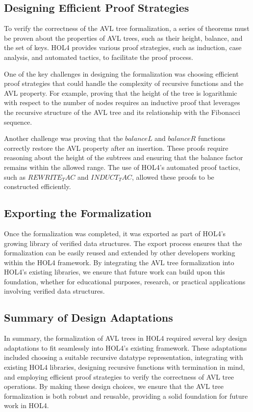 \documentclass[12pt]{article}
\begin{document}
\subsection{Designing Efficient Proof Strategies}

To verify the correctness of the AVL tree formalization, a series of theorems must be proven about the properties of AVL trees, such as their height, balance, and the set of keys. HOL4 provides various proof strategies, such as induction, case analysis, and automated tactics, to facilitate the proof process.

One of the key challenges in designing the formalization was choosing efficient proof strategies that could handle the complexity of recursive functions and the AVL property. For example, proving that the height of the tree is logarithmic with respect to the number of nodes requires an inductive proof that leverages the recursive structure of the AVL tree and its relationship with the Fibonacci sequence.

Another challenge was proving that the \(balanceL\) and \(balanceR\) functions correctly restore the AVL property after an insertion. These proofs require reasoning about the height of the subtrees and ensuring that the balance factor remains within the allowed range. The use of HOL4’s automated proof tactics, such as \(REWRITE_TAC\) and \(INDUCT_TAC\), allowed these proofs to be constructed efficiently.

\subsection{Exporting the Formalization}

Once the formalization was completed, it was exported as part of HOL4’s growing library of verified data structures. The export process ensures that the formalization can be easily reused and extended by other developers working within the HOL4 framework. By integrating the AVL tree formalization into HOL4’s existing libraries, we ensure that future work can build upon this foundation, whether for educational purposes, research, or practical applications involving verified data structures.

\subsection{Summary of Design Adaptations}

In summary, the formalization of AVL trees in HOL4 required several key design adaptations to fit seamlessly into HOL4’s existing framework. These adaptations included choosing a suitable recursive datatype representation, integrating with existing HOL4 libraries, designing recursive functions with termination in mind, and employing efficient proof strategies to verify the correctness of AVL tree operations. By making these design choices, we ensure that the AVL tree formalization is both robust and reusable, providing a solid foundation for future work in HOL4.
\end{document}
